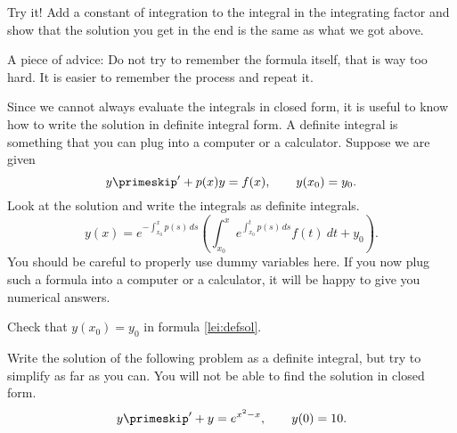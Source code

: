 \medskip

 Try it!  Add a constant of integration to the integral in
the integrating factor and show that the solution you get in the end is the
same as what we got above.

\medskip

A piece of advice: Do not try to remember the formula itself, that is way too
hard.  It is easier to remember the process and repeat it.

Since we cannot always evaluate the integrals in closed form, it is useful to
know how to write the solution in definite integral form.  A definite
integral is something that
you can plug into a computer or a calculator.  Suppose we are given
\begin{equation*}
y\primeskip ' + p(x) y = f(x) , \qquad y(x_0) = y_0 .
\end{equation*}
Look at the solution and write the integrals
as definite integrals.
\begin{equation} \label{lei:defsol}
\boxed{
~~
y(x) = e^{-\int_{x_0}^x p(s)\, ds} \left( \int_{x_0}^x e^{\int_{x_0}^t p(s)\, ds}
f(t) ~dt + y_0 \right).
~~
}
\end{equation}
You should
be careful to properly use dummy variables here.  If you now plug such a
formula into a
computer or a calculator, it will be happy to give you numerical answers.

\medskip

 Check that $y(x_0) = y_0$ in formula \eqref{lei:defsol}.

\medskip

 Write the solution of the following problem
as a definite integral, but try to simplify as far as you can.  You will not
be able to find the solution in closed form.
\begin{equation*}
y\primeskip ' + y = e^{x^2-x}, \qquad y(0) = 10 .
\end{equation*}

\medskip



